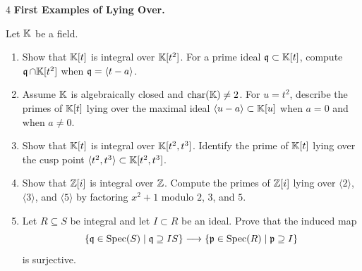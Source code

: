 \documentclass[Notebook.tex]{subfiles}
\begin{document}
\begin{problem}{4}
    \textbf{First Examples of Lying Over.} 
    
    Let $\mathbb K$ be a field.
    \begin{enumerate}
        \item Show that $\mathbb K[t]$ is integral over $\mathbb K[t^2]$. For a prime ideal $\operatorname{\mathfrak{q}}\subset \mathbb K[t]$, compute $\operatorname{\mathfrak{q}}\cap \mathbb K[t^2]$ when $\operatorname{\mathfrak{q}}=\langle t-a\rangle$.
        \item Assume $\mathbb K$ is algebraically closed and $\operatorname{char}(\mathbb K)\neq 2$. For $u=t^2$, describe the primes of $\mathbb K[t]$ lying over the maximal ideal $\langle u-a\rangle\subset \mathbb K[u]$ when $a=0$ and when $a\neq 0$.
        \item Show that $\mathbb K[t]$ is integral over $\mathbb K[t^2,t^3]$. Identify the prime of $\mathbb K[t]$ lying over the cusp point $\langle t^2,t^3\rangle\subset \mathbb K[t^2,t^3]$.
        \item Show that $\mathbb Z[i]$ is integral over $\mathbb Z$. Compute the primes of $\mathbb Z[i]$ lying over $\langle 2\rangle$, $\langle 3\rangle$, and $\langle 5\rangle$ by factoring $x^2+1$ modulo $2$, $3$, and $5$.
        \item Let $R\subseteq S$ be integral and let $I\subset R$ be an ideal. Prove that the induced map
        \[
        \{\operatorname{\mathfrak{q}}\in\operatorname{Spec}(S)\mid \operatorname{\mathfrak{q}}\supseteq IS\}\longrightarrow \{\operatorname{\mathfrak{p}}\in\operatorname{Spec}(R)\mid \operatorname{\mathfrak{p}}\supseteq I\}
        \]
        is surjective.
    \end{enumerate}    
\end{problem}
\end{document}
